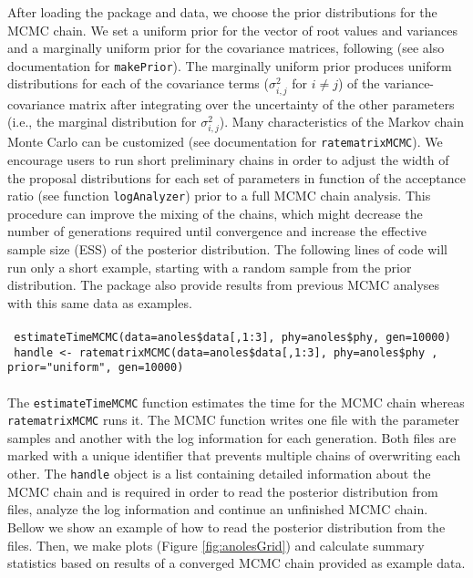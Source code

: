 After loading the package and data, we choose the prior distributions for the MCMC chain. We set a uniform prior for the vector of root values and variances and a marginally uniform prior for the covariance matrices, following \citet{barnard_modeling_2000} (see also documentation for \texttt{makePrior}). The marginally uniform prior produces uniform distributions for each of the covariance terms ($\sigma_{i,j}^{2}$ for $i \neq j$) of the variance-covariance matrix after integrating over the uncertainty of the other parameters (i.e., the marginal distribution for $\sigma_{i,j}^{2}$). Many characteristics of the Markov chain Monte Carlo can be customized (see documentation for \texttt{ratematrixMCMC}). We encourage users to run short preliminary chains in order to adjust the width of the proposal distributions for each set of parameters in function of the acceptance ratio (see function \texttt{logAnalyzer}) prior to a full MCMC chain analysis. This procedure can improve the mixing of the chains, which might decrease the number of generations required until convergence and increase the effective sample size (ESS) of the posterior distribution. The following lines of code will run only a short example, starting with a random sample from the prior distribution. The package also provide results from previous MCMC analyses with this same data as examples.\\
\\
\hspace*{20pt} \texttt{ estimateTimeMCMC(data=anoles\$data[,1:3], phy=anoles\$phy, gen=10000) }\\
\hspace*{20pt} \texttt{ handle <- ratematrixMCMC(data=anoles\$data[,1:3], phy=anoles\$phy \newline, prior="uniform", gen=10000)}\\
\\
The \texttt{estimateTimeMCMC} function estimates the time for the MCMC chain whereas \linebreak \texttt{ratematrixMCMC} runs it. The MCMC function writes one file with the parameter samples and another with the log information for each generation. Both files are marked with a unique identifier that prevents multiple chains of overwriting each other. The \texttt{handle} object is a list containing detailed information about the MCMC chain and is required in order to read the posterior distribution from files, analyze the log information and continue an unfinished MCMC chain. Bellow we show an example of how to read the posterior distribution from the files. Then, we make plots (Figure \ref{fig:anolesGrid}) and calculate summary statistics based on results of a converged MCMC chain provided as example data.\\
